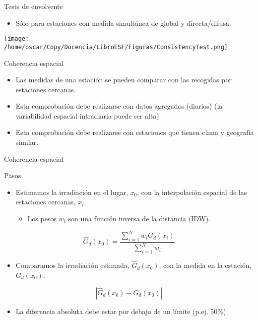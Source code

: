 \documentclass[xcolor={usenames,svgnames,dvipsnames}]{beamer}
\let\cite\parencite
\begin{document}
\begin{frame}[label=sec-3-6]{Tests de envolvente}
\begin{itemize}
\item Sólo para estaciones con medida simultánea de global y directa/difusa.
\end{itemize}

\texttt{[image: /home/oscar/Copy/Docencia/LibroESF/Figuras/ConsistencyTest.png]}

\cite{Younes.Claywell.ea2005}
\end{frame}
\begin{frame}[label=sec-3-7]{Coherencia espacial}
\begin{itemize}
\item Las medidas de una estación se pueden comparar con las recogidas por estaciones cercanas.
\item Esta comprobación debe realizarse con \alert{datos agregados} (diarios) (la variabilidad espacial intradiaria puede ser alta)
\item Esta comprobación debe realizarse con estaciones que tienen \alert{clima y geografía similar}.
\end{itemize}

\cite{Journee.Bertrand2011}
\end{frame}
\begin{frame}[label=sec-3-8]{Coherencia espacial}
\begin{block}{Pasos}
\begin{itemize}
\item Estimamos la irradiación en el lugar, $x_0$, con la interpolación espacial de las estaciones cercanas, $x_i$.
\begin{itemize}
\item Los pesos $w_i$ son una función inversa de la distancia (IDW).
\end{itemize}
\end{itemize}
\[
\widehat{G}_d(x_0) = \frac{\sum_{i=1}^N w_i G_{d}(x_i)}{\sum_{i=1}^N w_i} 
\]
\begin{itemize}
\item Comparamos la irradiación estimada, $\widehat{G}_d(x_0)$, con la medida en la estación, $G_d(x_0)$.
\end{itemize}
\[
\left| \widehat{G}_d(x_0) - G_d(x_0) \right|
\]
\begin{itemize}
\item La diferencia absoluta debe estar por debajo de un límite (p.ej. 50\%)
\end{itemize}
\end{block}
\end{frame}
\end{document}
